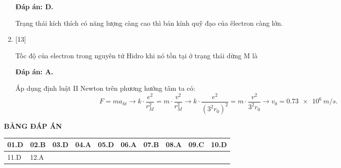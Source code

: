 \begin{enumerate}[label=\bfseries Câu \arabic*:]
		\loigiai
		{		\textbf{Đáp án: D.}

Trạng thái kích thích có năng lượng càng cao thì bán kính quỹ đạo của êlectron càng lớn.		
		}
		
		\item {}
	
		\cauhoi
		{Tốc độ của electron trong nguyên tử Hidro khi nó tồn tại ở trạng thái dừng M là
		}
	
		\loigiai
		{		\textbf{Đáp án: A.}

Áp dụng định luật II Newton trên phương hướng tâm ta có:
$$
	F = m a_{ht} \rightarrow k \cdot \dfrac{e^{2}}{r_{M}^2} = m \cdot \dfrac{v^{2}}{r_{M}^2} \rightarrow k \cdot \dfrac{e^{2}}{\left( 3^{2} r_{0} \right)^{2}} = m \cdot \dfrac{v^{2}}{ 3^{2} r_{0} } \rightarrow v_{0} = \SI{0,73e6}{m/s}.
$$		
		}
	
\end{enumerate}

\loigiai
{
	\begin{center}
		\textbf{BẢNG ĐÁP ÁN}
	\end{center}
	\begin{center}
		\begin{tabular}{|m{2.8em}|m{2.8em}|m{2.8em}|m{2.8em}|m{2.8em}|m{2.8em}|m{2.8em}|m{2.8em}|m{2.8em}|m{2.8em}|}
			\hline
			01.D  & 02.B  & 03.D  & 04.A   & 05.D  & 06.A  & 07.B & 08.A & 09.C & 10.D \\
			\hline
			11.D  & 12.A  &  &  &  &  & & & &  \\
			\hline
			
		\end{tabular}
	\end{center}
}


